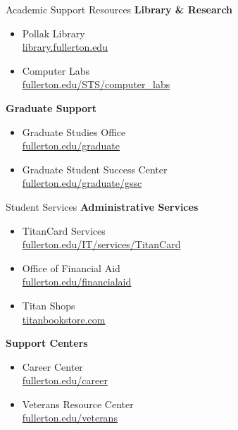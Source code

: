 \documentclass[10pt]{beamer}
\begin{document}
    \begin{frame}{Academic Support Resources}
    \textbf{Library \& Research}
    \begin{itemize}
    \item Pollak Library \\
        \small{\url{library.fullerton.edu}}
    \item Computer Labs \\
        \small{\url{fullerton.edu/STS/computer_labs}}
    \end{itemize}
    
    \textbf{Graduate Support}
    \begin{itemize}
    \item Graduate Studies Office \\
        \small{\url{fullerton.edu/graduate}}
    \item Graduate Student Success Center \\
        \small{\url{fullerton.edu/graduate/gssc}}
    \end{itemize}
    \end{frame}
    
    \begin{frame}{Student Services}
    \textbf{Administrative Services}
    \begin{itemize}
    \item TitanCard Services \\
        \small{\url{fullerton.edu/IT/services/TitanCard}}
    \item Office of Financial Aid \\
        \small{\url{fullerton.edu/financialaid}}
    \item Titan Shops \\
        \small{\url{titanbookstore.com}}
    \end{itemize}
    
    \textbf{Support Centers}
    \begin{itemize}
    \item Career Center \\
        \small{\url{fullerton.edu/career}}
    \item Veterans Resource Center \\
        \small{\url{fullerton.edu/veterans}}
    \end{itemize}
    \end{frame}
    
\end{document}
